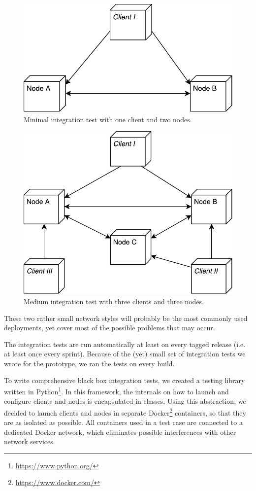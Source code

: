 \begin{figure}
	\centering
	\includegraphics[width=0.5\linewidth]{resources/integration_test_small}
	\caption[Minimal integration test]{Minimal integration test with one \gls{client} and two \glspl{node}.}
	\label{fig:integrationtestsmall}
\end{figure}

\begin{figure}
	\centering
	\includegraphics[width=0.5\linewidth]{resources/integration_test_medium}
	\caption[Medium integration test]{Medium integration test with three \glspl{client} and three \glspl{node}.}
	\label{fig:integrationtestmedium}
\end{figure}

These two rather small network styles will probably be the most commonly used deployments, yet cover most of the possible problems that may occur.

The integration tests are run automatically at least on every tagged release (i.e. at least once every sprint). Because of the (yet) small set of integration tests we wrote for the prototype, we ran the tests on every build.

To write comprehensive black box integration tests, we created a testing library written in Python\footnote{\url{https://www.python.org/}}. In this framework, the internals on how to launch and configure \glspl{client} and \glspl{node} is encapsulated in classes. Using this abstraction, we decided to launch \glspl{client} and \glspl{node} in separate Docker\footnote{\url{https://www.docker.com/}} containers, so that they are as isolated as possible. All containers used in a test case are connected to a dedicated Docker network, which eliminates possible interferences with other network services.

